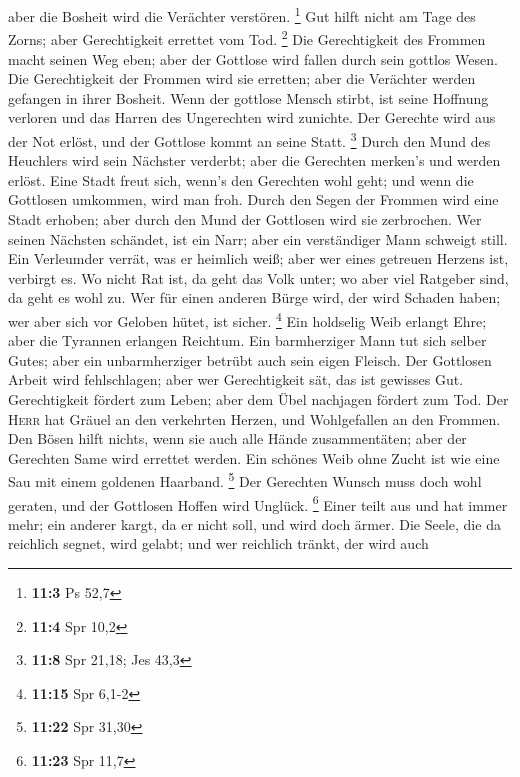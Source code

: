 aber die Bosheit wird die Verächter verstören. \footnote{\textbf{11:3}
  Ps 52,7}  Gut hilft nicht am Tage des Zorns; aber
Gerechtigkeit errettet vom Tod. \footnote{\textbf{11:4} Spr 10,2}
 Die Gerechtigkeit des Frommen macht seinen Weg eben; aber
der Gottlose wird fallen durch sein gottlos Wesen.  Die
Gerechtigkeit der Frommen wird sie erretten; aber die Verächter werden
gefangen in ihrer Bosheit.  Wenn der gottlose Mensch
stirbt, ist seine Hoffnung verloren und das Harren des Ungerechten wird
zunichte.  Der Gerechte wird aus der Not erlöst, und der
Gottlose kommt an seine Statt. \footnote{\textbf{11:8} Spr 21,18; Jes
  43,3}  Durch den Mund des Heuchlers wird sein Nächster
verderbt; aber die Gerechten merken's und werden erlöst. 
Eine Stadt freut sich, wenn's den Gerechten wohl geht; und wenn die
Gottlosen umkommen, wird man froh.  Durch den Segen der
Frommen wird eine Stadt erhoben; aber durch den Mund der Gottlosen wird
sie zerbrochen.  Wer seinen Nächsten schändet, ist ein
Narr; aber ein verständiger Mann schweigt still.  Ein
Verleumder verrät, was er heimlich weiß; aber wer eines getreuen Herzens
ist, verbirgt es.  Wo nicht Rat ist, da geht das Volk
unter; wo aber viel Ratgeber sind, da geht es wohl zu. 
Wer für einen anderen Bürge wird, der wird Schaden haben; wer aber sich
vor Geloben hütet, ist sicher. \footnote{\textbf{11:15} Spr 6,1-2}
 Ein holdselig Weib erlangt Ehre; aber die Tyrannen
erlangen Reichtum.  Ein barmherziger Mann tut sich selber
Gutes; aber ein unbarmherziger betrübt auch sein eigen Fleisch.
 Der Gottlosen Arbeit wird fehlschlagen; aber wer
Gerechtigkeit sät, das ist gewisses Gut.  Gerechtigkeit
fördert zum Leben; aber dem Übel nachjagen fördert zum Tod.
 Der \textsc{Herr} hat Gräuel an den verkehrten Herzen,
und Wohlgefallen an den Frommen.  Den Bösen hilft nichts,
wenn sie auch alle Hände zusammentäten; aber der Gerechten Same wird
errettet werden.  Ein schönes Weib ohne Zucht ist wie
eine Sau mit einem goldenen Haarband. \footnote{\textbf{11:22} Spr 31,30}
 Der Gerechten Wunsch muss doch wohl geraten, und der
Gottlosen Hoffen wird Unglück. \footnote{\textbf{11:23} Spr 11,7}
 Einer teilt aus und hat immer mehr; ein anderer kargt,
da er nicht soll, und wird doch ärmer.  Die Seele, die da
reichlich segnet, wird gelabt; und wer reichlich tränkt, der wird auch
